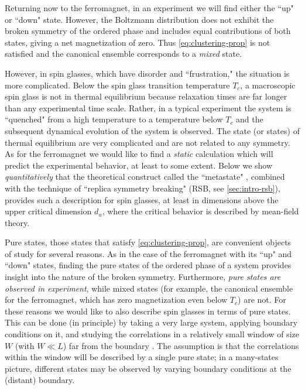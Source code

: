 Returning now to the ferromagnet, in an experiment we will find either the
``up" or ``down" state. However, the Boltzmann distribution does not exhibit
the broken symmetry of the ordered phase and includes equal contributions of
both states, giving a net magnetization of zero. Thus \cref{eq:clustering-prop}
is not satisfied and the canonical ensemble corresponds to a \emph{mixed}
state.

However, in spin glasses, which have disorder and ``frustration," the situation
is more complicated. Below the spin glass transition temperature $T_c$, a
macroscopic spin glass is not in thermal equilibrium because relaxation times
are far longer than any experimental time scale. Rather, in a typical
experiment the system is ``quenched" from a high temperature to a temperature
below $T_c$ and the subsequent dynamical evolution of the system is observed.
The state (or states) of thermal equilibrium are very complicated and are not
related to any symmetry.
As for the ferromagnet we would like to find a \emph{static} calculation which
will predict the experimental behavior, at least to some extent. Below we show
\emph{quantitatively} that the theoretical construct called the ``metastate"
\autocite{newman1997metastate,aizenman1990rounding},
combined with the technique of ``replica symmetry breaking" (RSB, see
\cref{sec:intro-rsb}), provides such a description for spin glasses, at least in
dimensions above the upper critical dimension $d_u$, where the critical
behavior is described by mean-field theory.

Pure states, those states that satisfy \cref{eq:clustering-prop}, are
convenient objects of study for several reasons. As in the case of the
ferromagnet with its ``up" and ``down" states, finding the pure states of the
ordered phase of a system provides insight into the nature of the broken
symmetry. Furthermore, \emph{pure states are observed in experiment}, while
mixed states (for example, the canonical ensemble for the ferromagnet, which
has zero magnetization even below $T_c$) are not. For these reasons we would
like to also describe spin glasses in terms of pure states. This can be done
(in principle) by taking a very large system, applying boundary conditions on
it, and studying the correlations in a relatively small window of size $W$
(with $W \ll L$) far from the boundary
\autocite{newman2003ordering,read2014short}. The assumption is that the
correlations within the window will be described by a single pure state; in a
many-states picture, different states may be observed by varying boundary
conditions at the (distant) boundary.

